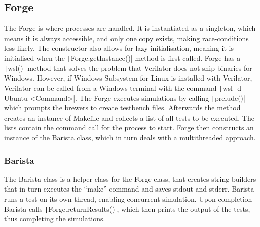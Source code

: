 \subsection{Forge}
The Forge is where processes are handled. It is instantiated as a singleton, which means it is always accessible, and only one copy exists, making race-conditions less likely. The constructor also allows for lazy initialisation, meaning it is initialised when the \texttt|Forge.getInstance()| method is first called.\newline
Forge has a \texttt|wsl()| method that solves the problem that Verilator does not ship binaries for Windows. However, if Windows Subsystem for Linux is installed with Verilator, Verilator can be called from a Windows terminal with the command \texttt|wsl -d Ubuntu <Command>|.
The Forge executes simulations by calling \texttt|prelude()| which prompts the brewers to create testbench files. Afterwards the method creates an instance of Makefile and collects a list of all tests to be executed. The lists contain the command call for the process to start. Forge then constructs an instance of the Barista class, which in turn deals with a multithreaded approach.
\subsubsection{Barista}
The Barista class is a helper class for the Forge class, that creates string builders that in turn executes the ``make'' command and saves stdout and stderr. Barista runs a test on its own thread, enabling concurrent simulation. Upon completion Barista calls \texttt|Forge.returnResults()|, which then prints the output of the tests, thus completing the simulations.